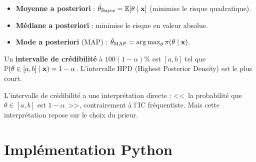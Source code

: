 \begin{definition}
\begin{itemize}
\item \textbf{Moyenne a posteriori} : $\hat{\theta}_{\mathrm{Bayes}}=\mathbb{E}[\theta\mid\mathbf{x}]$ (minimise le risque quadratique).
\item \textbf{M\'ediane a posteriori} : minimise le risque en valeur absolue.
\item \textbf{Mode a posteriori} (MAP) : $\hat{\theta}_{\mathrm{MAP}}=\operatorname*{arg\,max}_\theta\pi(\theta\mid\mathbf{x})$.
\end{itemize}
\end{definition}

\begin{definition}
Un \textbf{intervalle de cr\'edibilit\'e} \`a $100(1-\alpha)\%$ est $[a,b]$ tel que $\mathbb{P}(\theta\in[a,b]\mid\mathbf{x})=1-\alpha$. L'intervalle HPD (Highest Posterior Density) est le plus court.
\end{definition}

\begin{attention}
L'intervalle de cr\'edibilit\'e a une interpr\'etation directe : <<~la probabilit\'e que $\theta\in[a,b]$ est $1-\alpha$~>>, contrairement \`a l'IC fr\'equentiste. Mais cette interpr\'etation repose sur le choix du prieur.
\end{attention}

\section{Impl\'ementation Python}

